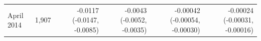 \begin{tabular}{lrrrrr}
April 2014 & 1,907 & -0.0117 (-0.0147, -0.0085) & -0.0043 (-0.0052, -0.0035) & -0.00042 (-0.00054, -0.00030) & -0.00024 (-0.00031, -0.00016) \\

\end{tabular}

